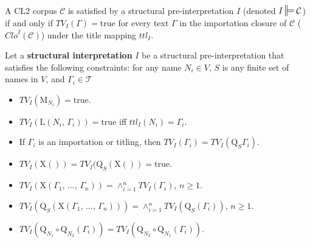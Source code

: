 \documentclass{IOS-Book-Article}
\newcommand{\corp}{ \mathcal{C} }
\newcommand{\texts}{ \mathcal{T} }
\newcommand{\ttl}{\mathit{ttl}}
\newcommand{\Clo}{\mathit{Clo}}
\newcommand{\true}{\mathrm{true}}
\newcommand{\domOp}[1]{\mathrm{Q}_{#1}}
\newcommand{\txtOp}{\mathrm{X}}
\newcommand{\txtOpone}[1]{\txtOp(#1)}
\newcommand{\txtOpthree}[3]{\txtOp(\text{$#1$, $#2$, $#3$})}
\newcommand{\ttlOp}[2]{\mathrm{L}(\text{$#1$, $#2$})}
\newcommand{\impOp}[1]{\mathrm{M}_{#1}}
\newcommand{\smdpf}{\ensuremath{\ddtstile[ss]{}{}}}
\newcommand{\Sat}[2]{{#1}\smdpf{#2}}
\newcommand{\mycomment}[1]{}
\begin{document}
\mycomment{subject to the following constraints.
Importations are always true, and text constructions with only texts as arguments are true if all their arguments are true.
Titlings are true if they are in agreement with the title mapping, and application of a domain restriction to a titling or importation preserves its truth value.
The truth value of domain restrictions applied to a text construction with only text arguments is true iff the domain restriction of each argument is true. 
The assignment of truth values to a domain restriction applied to unary text constructions, domain restrictions or importations is restricted only in that the truth value of a set of domain restrictions applied to a given text is independent of the order of application and multiplicity of application of the domain restrictions, as well as the appearance of intervening text construction operators.}

A CL2 corpus $\corp$ is satisfied by a structural pre-interpretation $I$ (denoted $\Sat{I}{\corp}$) if and only if $TV_I(\Gamma)=\true$ for every text $\Gamma$ in the importation closure of $\corp$ ($\Clo^I(\corp)$) under the title mapping $ttl_I$.

Let a \textbf{structural interpretation} $I$ be a structural pre-interpretation that satisfies the following constraints: for any name $N_i\in V$, $S$ is any finite set of names in $V$, and $\Gamma_i\in\texts$
\begin{itemize}
\item $TV_I(\impOp{N_i}) = \true$. 
\item $TV_I(\ttlOp{N_i}{\Gamma_i})=\true$ iff $\ttl_I(N_i)=\Gamma_i$. 
\item If $\Gamma_i$ is an importation or titling, then $TV_I(\Gamma_i) = TV_I(\domOp{S}{\Gamma_i})$.
\item
$TV_I(\txtOpone{}) = TV_I(\domOp{S}(\txtOpone{}) = \true$.
\item $TV_I(\txtOpthree{\Gamma_1}{\ldots}{\Gamma_n})=\wedge_{i=1}^{n}TV_I(\Gamma_i)$, $n\ge 1$.
\item $TV_I(\domOp{S}(\txtOpthree{\Gamma_1}{\ldots}{\Gamma_n})) = \wedge_{i=1}^{n}TV_I(\domOp{S}(\Gamma_i))$, $n\ge 1$.
\item $TV_I(\domOp{N_1}\circ\domOp{N_2}(\Gamma_i)) = TV_I(\domOp{N_2}\circ\domOp{N_1}(\Gamma_i))$.
\end{itemize}
\end{document}
